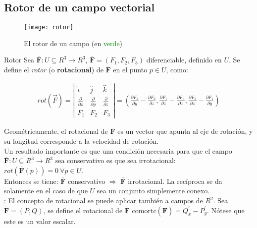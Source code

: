 \documentclass[a4paper, twoside]{article}
\numberwithin{equation}{section}
\numberwithin{figure}{section}
\numberwithin{table}{section}
\newcommand{\vect}[1]{\overline{\textbf{#1}}}
\begin{document}
\subsection{Rotor de un campo vectorial}
\begin{minipage}{0.28\textwidth}
	\begin{figure}[H]
		\centering
		\texttt{[image: rotor]}
		\caption{El rotor de un campo (en \textcolor{green}{verde})}
	\end{figure}
\end{minipage}
\begin{minipage}{0.7\textwidth}
	\begin{definicion*}{Rotor}
		Sea $\vect{F}: U \subseteq R^3 \to R^3$, $\vect{F}=(F_1,F_2,F_3)$ diferenciable, definido en $U$. Se define el \emph{rotor} (o \textbf{rotacional}) de $\vect{F}$ en el punto $p \in U$, como:
		\begin{small}
			\begin{align}
				rot(\vec{F})=\left|\begin{array}{ccc} \hat{i} & \hat{j} & \hat{k} \\\frac{\partial}{\partial x} & \frac{\partial}{\partial y} & \frac{\partial}{\partial z}\\
				F_{1} & F_{2} & F_{3}\end{array}\right|=\left(\frac{\partial F_{3}}{\partial y}-\frac{\partial F_{2}}{\partial z},\frac{\partial F_{1}}{\partial z}-\frac{\partial F_{3}}{\partial x},\frac{\partial F_{2}}{\partial x}-\frac{\partial F_{1}}{\partial y}\right)
			\end{align}
		\end{small}
		
		Geométricamente, el rotacional de $\vect{F}$ es un vector que apunta al eje de rotación, y su longitud corresponde a la velocidad de rotación.\\
		
		Un resultado importante es que una condición necesaria para que el campo $\vect{F}: U \subseteq R^3 \to R^3$ sea conservativo es que sea irrotacional: $rot\left(\vect{F}(p)\right)=0\:\forall p \in U$.\\
		
		Entonces se tiene: $\vect{F}$ conservativo $\Longrightarrow$ $\vect{F}$ irrotacional. La recíproca se da solamente en el caso de que $U$ sea un conjunto simplemente conexo.\\
		
		: El concepto de rotacional se puede aplicar también a campos de $R^2$. Sea $\vect{F} = (P,Q)$, se define el rotacional de $\vect{F}$ como$\text{rtc}(\vect{F})=Q^\prime_x-P^\prime_y$. Nótese que este es un valor escalar.
	\end{definicion*}
\end{minipage}
\end{document}
